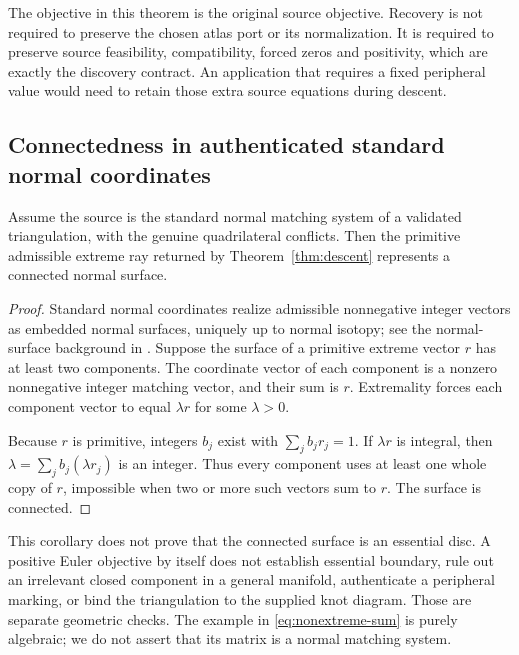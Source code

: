 The objective in this theorem is the original source objective. Recovery is not required to preserve the chosen atlas port or its normalization. It is required to preserve source feasibility, compatibility, forced zeros and positivity, which are exactly the discovery contract. An application that requires a fixed peripheral value would need to retain those extra source equations during descent.

\subsection{Connectedness in authenticated standard normal coordinates}
\begin{corollary}
\label{cor:connected}
Assume the source is the standard normal matching system of a validated triangulation, with the genuine quadrilateral conflicts. Then the primitive admissible extreme ray returned by Theorem~\ref{thm:descent} represents a connected normal surface.
\end{corollary}
\begin{proof}
Standard normal coordinates realize admissible nonnegative integer vectors as embedded normal surfaces, uniquely up to normal isotopy; see the normal-surface background in \cite{bo,bps}. Suppose the surface of a primitive extreme vector $r$ has at least two components. The coordinate vector of each component is a nonzero nonnegative integer matching vector, and their sum is $r$. Extremality forces each component vector to equal $\lambda r$ for some $\lambda>0$.

Because $r$ is primitive, integers $b_j$ exist with $\sum_jb_jr_j=1$. If $\lambda r$ is integral, then $\lambda=\sum_jb_j(\lambda r_j)$ is an integer. Thus every component uses at least one whole copy of $r$, impossible when two or more such vectors sum to $r$. The surface is connected.
\end{proof}

This corollary does not prove that the connected surface is an essential disc. A positive Euler objective by itself does not establish essential boundary, rule out an irrelevant closed component in a general manifold, authenticate a peripheral marking, or bind the triangulation to the supplied knot diagram. Those are separate geometric checks. The example in \eqref{eq:nonextreme-sum} is purely algebraic; we do not assert that its matrix is a normal matching system.

